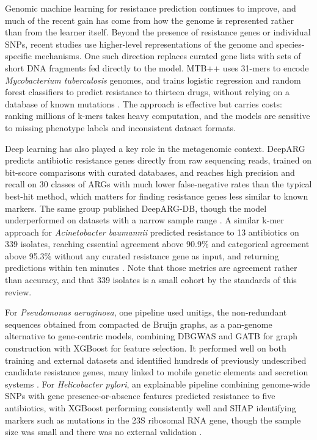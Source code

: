 Genomic machine learning for resistance prediction continues to improve, and much of the recent gain has come from how the genome is represented rather than from the learner itself. Beyond the presence of resistance genes or individual SNPs, recent studies use higher-level representations of the genome and species-specific mechanisms. One such direction replaces curated gene lists with sets of short DNA fragments fed directly to the model. MTB++ uses 31-mers to encode \textit{Mycobacterium tuberculosis} genomes, and trains logistic regression and random forest classifiers to predict resistance to thirteen drugs, without relying on a database of known mutations \cite{serajian2024mtbpp}. The approach is effective but carries costs: ranking millions of k-mers takes heavy computation, and the models are sensitive to missing phenotype labels and inconsistent dataset formats.

\vspace{1em}

Deep learning has also played a key role in the metagenomic context. DeepARG predicts antibiotic resistance genes directly from raw sequencing reads, trained on bit-score comparisons with curated databases, and reaches high precision and recall on 30 classes of ARGs with much lower false-negative rates than the typical best-hit method, which matters for finding resistance genes less similar to known markers. The same group published DeepARG-DB, though the model underperformed on datasets with a narrow sample range \cite{ArangoArgoty2018}. A similar k-mer approach for \textit{Acinetobacter baumannii} predicted resistance to 13 antibiotics on 339 isolates, reaching essential agreement above 90.9\% and categorical agreement above 95.3\% without any curated resistance gene as input, and returning predictions within ten minutes \cite{Gao2024}. Note that those metrics are agreement rather than accuracy, and that 339 isolates is a small cohort by the standards of this review.

\vspace{1em}

For \textit{Pseudomonas aeruginosa}, one pipeline used unitigs, the non-redundant sequences obtained from compacted de Bruijn graphs, as a pan-genome alternative to gene-centric models, combining DBGWAS and GATB for graph construction with XGBoost for feature selection. It performed well on both training and external datasets and identified hundreds of previously undescribed candidate resistance genes, many linked to mobile genetic elements and secretion systems \cite{Do2024}. For \textit{Helicobacter pylori}, an explainable pipeline combining genome-wide SNPs with gene presence-or-absence features predicted resistance to five antibiotics, with XGBoost performing consistently well and SHAP identifying markers such as mutations in the 23S ribosomal RNA gene, though the sample size was small and there was no external validation \cite{Wang2025}.

